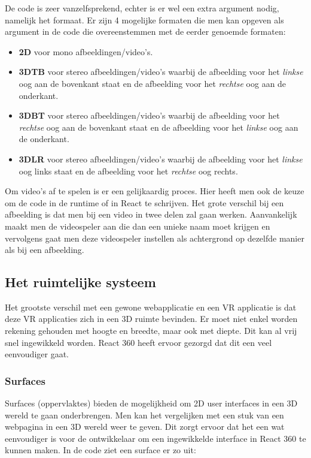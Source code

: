 De code is zeer vanzelfsprekend, echter is er wel een extra argument nodig, namelijk het formaat. Er zijn 4 mogelijke formaten die men kan opgeven als argument in de code die overeenstemmen met de eerder genoemde formaten:

\begin{itemize}
	\item \textbf{2D} voor mono afbeeldingen/video's.
	\item \textbf{3DTB} voor stereo afbeeldingen/video's waarbij de afbeelding voor het \textit{linkse} oog  aan de bovenkant staat en de afbeelding voor het \textit{rechtse} oog aan de onderkant.
	\item \textbf{3DBT} voor stereo afbeeldingen/video's waarbij de afbeelding voor het \textit{rechtse} oog aan de bovenkant staat en de afbeelding voor het \textit{linkse} oog aan de onderkant.
	\item \textbf{3DLR} voor stereo afbeeldingen/video's waarbij de afbeelding voor het \textit{linkse} oog links staat en de afbeelding voor het \textit{rechtse} oog rechts.
\end{itemize}

Om video's af te spelen is er een gelijkaardig proces. Hier heeft men ook de keuze om de code in de runtime of in React te schrijven. Het grote verschil bij een afbeelding is dat men bij een video in twee delen zal gaan werken. Aanvankelijk maakt men de videospeler aan die dan een unieke naam moet krijgen en vervolgens gaat men deze videospeler instellen als achtergrond op dezelfde manier als bij een afbeelding.

\subsection{Het ruimtelijke systeem}
\label{subsec:ruimtelijk-systeem}
Het grootste verschil met een gewone webapplicatie en een VR applicatie is dat deze VR applicaties zich in een 3D ruimte bevinden. Er moet niet enkel worden rekening gehouden met hoogte en breedte, maar ook met diepte. Dit kan al vrij snel ingewikkeld worden. React 360 heeft ervoor gezorgd dat dit een veel eenvoudiger gaat.

\subsubsection{Surfaces}
\label{ssubsec:surfaces}
Surfaces (oppervlaktes) bieden de mogelijkheid om 2D user interfaces in een 3D wereld te gaan onderbrengen. Men kan het vergelijken met een stuk van een webpagina in een 3D wereld weer te geven. Dit zorgt ervoor dat het een wat eenvoudiger is voor de ontwikkelaar om een ingewikkelde interface in React 360 te kunnen maken. In de code ziet een surface er zo uit:

